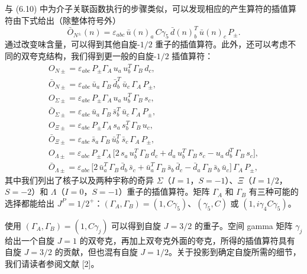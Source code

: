 与 (6.10) 中为介子关联函数执行的步骤类似，可以发现相应的产生算符的插值算符由下式给出（除整体符号外）
\begin{equation}
  \bar{O}_{N^\pm}(n) = \varepsilon_{abc}\, \bar u(n)_a\, C\gamma_5\,
    \bar d(n)_b^T\, \bar u(n)_c\, P_\pm .
\end{equation}
通过改变味含量，可以得到其他自旋-$1/2$ 重子的插值算符。此外，还可以考虑不同的双夸克结构，我们得到更一般的自旋-$1/2$ 插值算符：
\begin{equation}
  \begin{gathered}
    O_{N\pm} = \varepsilon_{abc}\, P_\pm \Gamma_A\, u_a\, u_b^T\, \Gamma_B\, d_c , \\
    \bar{O}_{N\pm} = \varepsilon_{abc}\, \bar u_a\, \Gamma_B\, \bar d_b^T\,
      \bar u_c\, \Gamma_A\, P_\pm , \\
    O_{\Sigma\pm} = \varepsilon_{abc}\, P_\pm \Gamma_A\, u_a\, u_b^T\,
      \Gamma_B\, s_c , \\
    \bar{O}_{\Sigma\pm} = \varepsilon_{abc}\, \bar u_a\, \Gamma_B\, \bar s_b^T\,
      \bar u_c\, \Gamma_A\, P_\pm , \\
    O_{\Xi\pm} = \varepsilon_{abc}\, P_\pm \Gamma_A\, s_a\, s_b^T\, \Gamma_B\,
      u_c , \\
    \bar{O}_{\Xi\pm} = \varepsilon_{abc}\, \bar s_a\, \Gamma_B\, \bar u_b^T\,
      \bar s_c\, \Gamma_A\, P_\pm , \\
    O_{\Lambda\pm} = \varepsilon_{abc}\, P_\pm \Gamma_A\,
      \bigl[ 2\, s_a\, u_b^T\, \Gamma_B\, d_c + d_a\, u_b^T\, \Gamma_B\, s_c
        - u_a\, d_b^T\, \Gamma_B\, s_c \bigr] , \\
    \bar{O}_{\Lambda\pm} = \varepsilon_{abc}\,
      \bigl[ 2\, \bar u_a^T\, \Gamma_B\, \bar d_b\, \bar s_c
        + \bar u_a^T\, \Gamma_B\, \bar s_b\, \bar d_c
        - \bar d_a\, \Gamma_B\, \bar s_b\, \bar u_c \bigr]\,
      \Gamma_A\, P_\pm ,
  \end{gathered}
\end{equation}
其中我们列出了核子以及两种宇称的奇异 $\Sigma$（$I = 1$，$S = -1$）、$\Xi$（$I = 1/2$，$S = -2$）和 $\Lambda$（$I = 0$，$S = -1$）重子的插值算符。矩阵 $\Gamma_A$ 和 $\Gamma_B$ 有三种可能的选择都能给出 $J^P = 1/2^+$：$(\Gamma_A, \Gamma_B) = (1, C\gamma_5)$、$(\gamma_5, C)$ 或 $(1, i\gamma_4 C\gamma_5)$。

使用 $(\Gamma_A, \Gamma_B) = (1, C\gamma_j)$ 可以得到自旋 $J = 3/2$ 的重子。空间 gamma 矩阵 $\gamma_j$ 给出一个自旋 $J = 1$ 的双夸克，再加上双夸克外面的夸克，所得的插值算符具有自旋 $J = 3/2$ 的贡献，但也混有自旋 $J = 1/2$。关于投影到确定自旋所需的细节，我们请读者参阅文献 [2]。

